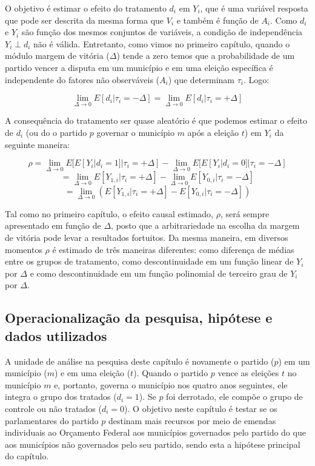O objetivo é estimar o efeito do tratamento $d_{i}$ em $Y_{i}$, que é uma variável resposta que pode ser descrita da mesma forma que $V_{i}$ e também é função de $A_{i}$. Como $d_{i}$ e $Y_{i}$ são função dos mesmos conjuntos de variáveis, a condição de independência $Y_{i} \perp d_{i}$ não é válida. Entretanto, como vimos no primeiro capítulo, quando o módulo margem de vitória ($\Delta$) tende a zero temos que a probabilidade de um partido vencer a disputa em um município e em uma eleição específica é independente do fatores não observáveis ($A_{i}$) que determinam $\tau_{i}$. Logo: 

\[
\lim_{\Delta \to 0} E[d_{i}|\tau_{i}=-\Delta]=\lim_{\Delta \to 0} E[d_{i}|\tau_{i}=+\Delta]
\]

A consequência do tratamento ser quase aleatório é que podemos estimar o efeito de $d_{i}$ (ou do o partido $p$ governar o município $m$ após a eleição $t$) em $Y_{i}$ da seguinte maneira:

\[\rho =\lim_{\Delta \to 0} E[E[Y_{i}|d_{i}=1]|\tau_{i}=+\Delta] - \lim_{\Delta \to 0} E[E[Y_{i}|d_{i}=0]|\tau_{i}=-\Delta]\]
\[=\lim_{\Delta \to 0} E[Y_{1,i}|\tau_{i}=+\Delta] - \lim_{\Delta \to 0} E[Y_{0,i}|\tau_{i}=-\Delta]\]
\[=\lim_{\Delta \to 0} (E[Y_{1,i}|\tau_{i}=+\Delta] - E[Y_{0,i}|\tau_{i}=-\Delta])\]

Tal como no primeiro capítulo, o efeito causal estimado, $\rho$, será sempre apresentado em função de $\Delta$, posto que a arbitrariedade na escolha da margem de vitória pode levar a resultados fortuitos. Da mesma maneira, em diversos momentos $\rho$ é estimado de três maneiras diferentes: como diferença de médias entre os grupos de tratamento, como descontinuidade em um função linear de $Y_{i}$ por $\Delta$ e como descontinuidade em um função polinomial de terceiro grau de $Y_{i}$ por $\Delta$.

\subsection{Operacionalização da pesquisa, hipótese e dados utilizados}

A unidade de análise na pesquisa deste capítulo é novamente o partido ($p$) em um município ($m$) e em uma eleição ($t$). Quando o partido $p$ vence as eleições $t$ no município $m$ e, portanto, governa o município nos quatro anos seguintes, ele integra o grupo dos tratados ($d_{i}=1$). Se $p$ foi derrotado, ele compõe o grupo de controle ou não tratados ($d_{i}=0$). O objetivo neste capítulo é testar se os parlamentares do partido $p$ destinam mais recursos por meio de emendas individuais ao Orçamento Federal aos municípios governados pelo partido do que aos municípios não governados pelo seu partido, sendo esta a hipótese principal do capítulo.

